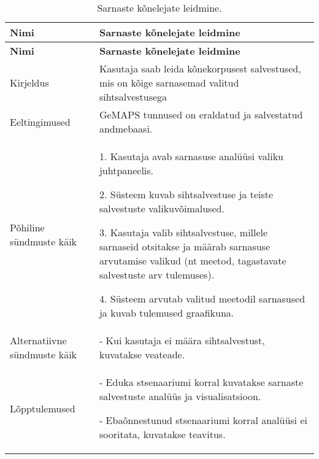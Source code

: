 \begin{longtable}{|p{2.5cm}|p{11cm}|}
    \caption{{Sarnaste kõnelejate leidmine.}}
    \label{tab:kasutusjuht4}\\ \hline
    \textbf{Nimi} &  \textbf{Sarnaste kõnelejate leidmine}  \\
    \hline
    \endfirsthead
    \hline
    \textbf{Nimi} &  \textbf{Sarnaste kõnelejate leidmine}  \\
    \hline
    \endhead
    \hline
    \endfoot
    \hline
    \endlastfoot
    Kirjeldus & Kasutaja saab leida kõnekorpusest salvestused, mis on kõige sarnasemad valitud sihtsalvestusega\\ \hline
    Eeltingimused & GeMAPS tunnused on eraldatud ja salvestatud andmebaasi.\\ \hline
    Põhiline sündmuste käik & 
    1. Kasutaja avab sarnasuse analüüsi valiku juhtpaneelis.
    
    2. Süsteem kuvab sihtsalvestuse ja teiste salvestuste valikuvõimalused.
    
    3. Kasutaja valib sihtsalvestuse, millele sarnaseid otsitakse ja määrab sarnasuse arvutamise valikud (nt meetod, tagastavate salvestuste arv tulemuses).
    
    4. Süsteem arvutab valitud meetodil sarnasused ja kuvab tulemused graafikuna.
    \\ \hline
    Alternatiivne sündmuste käik & 
    - Kui kasutaja ei määra sihtsalvestust, kuvatakse veateade.
    \\ \hline
    Lõpptulemused & 
    - Eduka stsenaariumi korral kuvatakse sarnaste salvestuste analüüs ja visualisatsioon.
    
    - Ebaõnnestunud stsenaariumi korral analüüsi ei sooritata, kuvatakse teavitus.
    \\ \hline
\end{longtable}

